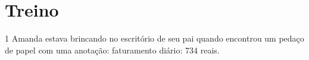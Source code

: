 \pagebreak

\section*{Treino}

\num{1} Amanda estava brincando no escritório de seu pai quando
encontrou um pedaço de papel com uma anotação: faturamento diário: 734 reais.


